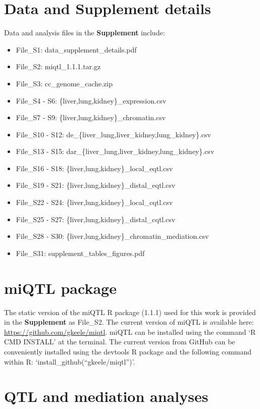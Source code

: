 \documentclass[9pt,twocolumn,twoside]{gsajnl}
\begin{document}
\clearpage

\section{Data and Supplement details}

Data and analysis files in the \textbf{Supplement} include:

\begin{itemize}
	\item File\_S1: data\_supplement\_details.pdf
	\item File\_S2: miqtl\_1.1.1.tar.gz
	\item File\_S3: cc\_genome\_cache.zip
	\item File\_S4 - S6: \{liver,lung,kidney\}\_expression.csv
	\item File\_S7 - S9: \{liver,lung,kidney\}\_chromatin.csv
	\item File\_S10 - S12: de\_\{liver\_lung,liver\_kidney,lung\_kidney\}.csv
	\item File\_S13 - S15: dar\_\{liver\_lung,liver\_kidney,lung\_kidney\}.csv
	\item File\_S16 - S18: \{liver,lung,kidney\}\_local\_eqtl.csv
	\item File\_S19 - S21: \{liver,lung,kidney\}\_distal\_eqtl.csv
	\item File\_S22 - S24: \{liver,lung,kidney\}\_local\_cqtl.csv
	\item File\_S25 - S27: \{liver,lung,kidney\}\_distal\_cqtl.csv
	\item File\_S28 - S30: \{liver,lung,kidney\}\_chromatin\_mediation.csv
	\item File\_S31: supplement\_tables\_figures.pdf
\end{itemize}

\section{miQTL package}

The static version of the miQTL R package (1.1.1) used for this work is provided in the \textbf{Supplement} as File\_S2. The current version of miQTL is available here: \url{https://github.com/gkeele/miqtl}. miQTL can be installed using the command `R CMD INSTALL' at the terminal. The current version from GitHub can be conveniently installed using the devtools R package and the following command within R: `install\_github(``gkeele/miqtl'')'.

\section{QTL and mediation analyses}
\end{document}
